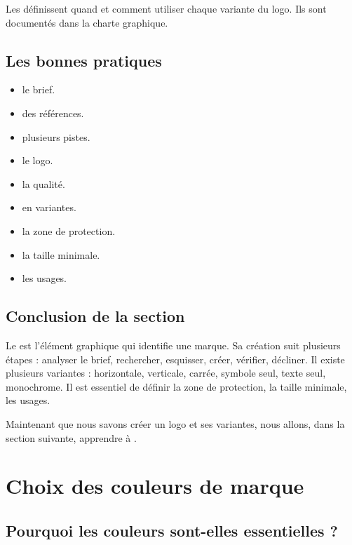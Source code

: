 Les  définissent quand et comment utiliser chaque variante du logo. Ils sont documentés dans la charte graphique.

\subsection{Les bonnes pratiques}

\begin{itemize}
    \item {} le brief.
    \item {} des références.
    \item {} plusieurs pistes.
    \item {} le logo.
    \item {} la qualité.
    \item {} en variantes.
    \item {} la zone de protection.
    \item {} la taille minimale.
    \item {} les usages.
\end{itemize}

\subsection*{Conclusion de la section}

Le  est l'élément graphique qui identifie une marque. Sa création suit plusieurs étapes : analyser le brief, rechercher, esquisser, créer, vérifier, décliner. Il existe plusieurs variantes : horizontale, verticale, carrée, symbole seul, texte seul, monochrome. Il est essentiel de définir la zone de protection, la taille minimale, les usages.

Maintenant que nous savons créer un logo et ses variantes, nous allons, dans la section suivante, apprendre à .

\section{Choix des couleurs de marque}

\subsection{Pourquoi les couleurs sont-elles essentielles ?}

